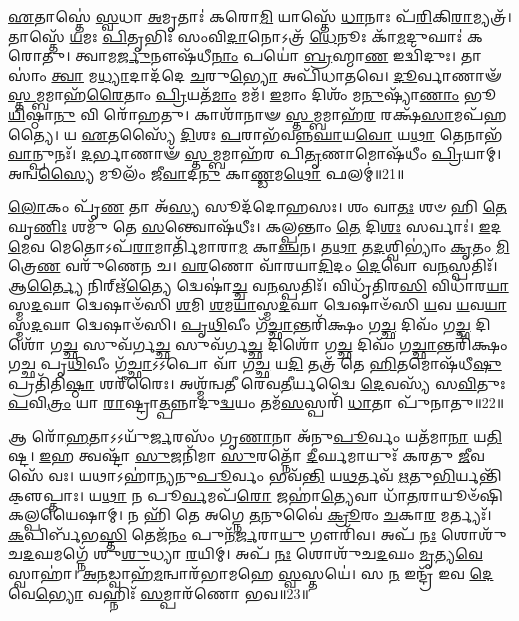 \-\ul{𑌏}\-𑌤𑌾𑌸𑍍𑌤𑍇॑ \ul{𑌸𑍍𑌵}\-𑌧𑌾 \ul{𑌅}\-𑌮𑍃𑌤𑌾𑌃॑ 𑌕𑌰𑍋\-\ul{𑌮𑌿} 𑌯𑌾𑌸𑍍𑌤𑍇᳴ \ul{𑌧𑌾}\-𑌨𑌾𑌃 𑌪᳴\-\ul{𑌰𑌿}\-𑌕𑌿\-\ul{𑌰𑌾}\-𑌮𑍍𑌯𑌤𑍍𑌰᳴। 
𑌤𑌾𑌸𑍍𑌤𑍇᳴ \ul{𑌯}\-𑌮𑌃 \ul{𑌪𑌿}\-𑌤𑍃𑌭𑌿𑌃᳴ 𑌸𑌂𑌵𑌿\-\ul{𑌦𑌾}\-𑌨𑍋𑌽𑌤𑍍𑌰᳴ \ul{𑌧𑍇}\-𑌨𑍂𑌃 𑌕𑌾᳴\-\ul{𑌮}\-𑌦𑍁𑌘𑌾𑌃॑ 𑌕𑌰𑍋𑌤𑍁। 
𑌤𑍍𑌵𑌾𑌮\-\ul{𑌰𑍍𑌜𑍁}\-𑌨𑍗𑌷᳴𑌧𑍀\-\ul{𑌨𑌾𑌂} 𑌪𑌯𑍋॑ \ul{𑌬𑍍𑌰}\-𑌹𑍍𑌮𑌾\-\ul{𑌣} 𑌇𑌦𑍍𑌵𑌿᳴𑌦𑍁𑌃। 
𑌤𑌾𑌸𑌾𑌂॑ \ul{𑌤𑍍𑌵𑌾} 𑌮\-\ul{𑌧𑍍𑌯𑌾}\-𑌦𑌾𑌦᳴𑌦𑍇 \ul{𑌚}\-𑌰𑍁\-\ul{𑌭𑍍𑌯𑍋} 𑌅𑌪𑌿᳴𑌧𑌾𑌤𑌵𑍇। 
\-\ul{𑌦𑍂}\-𑌰𑍍𑌵𑌾𑌣𑌾𑍟᳴ \ul{𑌸𑍍𑌤}\-𑌮𑍍𑌬𑌮𑌾𑌹᳴\-\ul{𑌰𑍈}\-𑌤𑌾𑌂 \ul{𑌪𑍍𑌰𑌿}\-𑌯𑌤᳴\-\ul{𑌮𑌾𑌂} 𑌮𑌮᳴। 
\-\ul{𑌇}\-𑌮𑌾𑌂 𑌦𑌿𑌶𑌂᳴ 𑌮\-\ul{𑌨𑍁}\-𑌷𑍍𑌯𑌾᳴\-\ul{𑌣𑌾𑌂} 𑌭𑍂\-\ul{𑌯𑌿}\-𑌷𑍍𑌠𑌾\-\ul{𑌨𑍁} 𑌵𑌿 𑌰𑍋᳴𑌹𑌤𑍁। 
𑌕𑌾𑌶𑌾᳴𑌨𑌾𑍟 \ul{𑌸𑍍𑌤}\-𑌮𑍍𑌬𑌮𑌾𑌹᳴\-\ul{𑌰} 𑌰𑌕𑍍𑌷᳴\-\ul{𑌸𑌾}\-𑌮𑌪᳴𑌹𑌤𑍍𑌯𑍈। 
𑌯 \ul{𑌏}\-𑌤𑌸𑍍𑌯𑍈᳴ \ul{𑌦𑌿}\-𑌶𑌃 \ul{𑌪}\-𑌰𑌾𑌭᳴𑌵𑌨𑍍𑌨\-\ul{𑌘𑌾}\-𑌯\-\ul{𑌵𑍋} 𑌯\-\ul{𑌥𑌾} 𑌤𑍇𑌨𑌾𑌭᳴\-\ul{𑌵𑌾}\-𑌨𑍍𑌪𑍁𑌨𑌃᳴। 
\-\ul{𑌦}\-𑌰𑍍𑌭𑌾𑌣𑌾𑍟᳴ \ul{𑌸𑍍𑌤}\-𑌮𑍍𑌬𑌮𑌾𑌹᳴𑌰 𑌪𑌿\-\ul{𑌤𑍃}\-𑌣𑌾𑌮𑍋𑌷᳴𑌧𑍀𑌂 \ul{𑌪𑍍𑌰𑌿}\-𑌯𑌾𑌮𑍍। 
𑌅𑌨𑍍𑌵\-\ul{𑌸𑍍𑌯𑍈} 𑌮𑍂𑌲𑌂᳴ 𑌜𑍀\-\ul{𑌵𑌾}\-𑌦\-\ul{𑌨𑍁} 𑌕𑌾\-\ul{𑌣𑍍𑌡}\-𑌮\-\ul{𑌥𑍋} 𑌫𑌲𑌮𑍍॑॥21॥

\-\ul{𑌲𑍋}\-𑌕𑌂 𑌪𑍃᳴\-\ul{𑌣} 𑌤𑌾 𑌅᳴\-\ul{𑌸𑍍𑌯} 𑌸𑍂𑌦᳴𑌦𑍋𑌹𑌸𑌃। 
𑌶𑌂 𑌵𑌾\-\ul{𑌤𑌃} 𑌶𑍞 𑌹𑌿 \ul{𑌤𑍇} 𑌘𑍃\-\ul{𑌣𑌿𑌃} 𑌶𑌮𑍁᳴ 𑌤𑍇 \ul{𑌸}\-𑌨𑍍𑌤𑍍𑌵𑍋𑌷᳴𑌧𑍀𑌃। 
𑌕𑌲𑍍𑌪𑌨𑍍𑌤𑌾𑌂 \ul{𑌤𑍇} 𑌦𑌿\-\ul{𑌶𑌃} 𑌸𑌰𑍍𑌵𑌾𑌃॑। 
\-\ul{𑌇}\-𑌦\-\ul{𑌮𑍇}\-𑌵 𑌮𑍇𑌤𑍋𑌽𑌪᳴\-\ul{𑌰𑌾}\-𑌮𑌾𑌰𑍍𑌤𑌿᳴𑌮𑌾𑌰𑌾\-\ul{𑌮} 𑌕𑌾\-\ul{𑌞𑍍𑌚}\-𑌨। 
𑌤\-\ul{𑌥𑌾} 𑌤\-\ul{𑌦}\-𑌶𑍍𑌵𑌿𑌭𑍍𑌯𑌾𑌂॑ \ul{𑌕𑍃}\-𑌤𑌂 \ul{𑌮𑌿}\-𑌤𑍍𑌰𑍇\-\ul{𑌣} 𑌵𑌰𑍁᳴𑌣𑍇𑌨 𑌚। 
\-\ul{𑌵}\-\-\ul{𑌰}\-𑌣𑍋 𑌵𑌾᳴𑌰𑌯𑌾\-\ul{𑌦𑌿}\-𑌦𑌂 \ul{𑌦𑍇}\-𑌵𑍋 𑌵\-\ul{𑌨}\-𑌸𑍍𑌪𑌤𑌿𑌃᳴। 
𑌆\-\ul{𑌰𑍍𑌤𑍍𑌯𑍈} 𑌨𑌿𑌰𑍍\mbox{}𑌋᳴\-\ul{𑌤𑍍𑌯𑍈} 𑌦𑍍𑌵𑍇𑌷𑌾॑\-\ul{𑌚𑍍𑌚} 𑌵\-\ul{𑌨}\-𑌸𑍍𑌪𑌤𑌿𑌃᳴। 
𑌵𑌿𑌧𑍃᳴𑌤𑌿𑌰\-\ul{𑌸𑌿} 𑌵𑌿𑌧𑌾᳴𑌰\-\ul{𑌯𑌾}\-𑌸𑍍𑌮\-\ul{𑌦}\-𑌘𑌾 𑌦𑍍𑌵𑍇𑌷𑌾𑍞᳴𑌸𑌿 \ul{𑌶}\-𑌮𑌿 \ul{𑌶}\-𑌮\-\ul{𑌯𑌾}\-𑌸𑍍𑌮\-\ul{𑌦}\-𑌘𑌾 𑌦𑍍𑌵𑍇𑌷𑌾𑍞᳴𑌸𑌿 \ul{𑌯}\-𑌵 \ul{𑌯}\-𑌵\-\ul{𑌯𑌾}\-𑌸𑍍𑌮\-\ul{𑌦}\-𑌘𑌾 𑌦𑍍𑌵𑍇𑌷𑌾𑍞᳴𑌸𑌿। 
\-\ul{𑌪𑍃}\-\-\ul{𑌥𑌿}\-𑌵𑍀𑌂 𑌗᳴\-\ul{𑌚𑍍𑌛𑌾}\-𑌨𑍍𑌤𑌰𑌿᳴𑌕𑍍𑌷𑌂 𑌗\-\ul{𑌚𑍍𑌛} 𑌦𑌿𑌵𑌂᳴ 𑌗\-\ul{𑌚𑍍𑌛} 𑌦𑌿𑌶𑍋᳴ 𑌗\-\ul{𑌚𑍍𑌛} 𑌸𑍁𑌵᳴𑌰𑍍𑌗\-\ul{𑌚𑍍𑌛} 𑌸𑍁𑌵᳴𑌰𑍍𑌗\-\ul{𑌚𑍍𑌛} 𑌦𑌿𑌶𑍋᳴ 𑌗\-\ul{𑌚𑍍𑌛} 𑌦𑌿𑌵𑌂᳴ 𑌗\-\ul{𑌚𑍍𑌛𑌾}\-𑌨𑍍𑌤𑌰𑌿᳴𑌕𑍍𑌷𑌂 𑌗𑌚𑍍𑌛 𑌪𑍃\-\ul{𑌥𑌿}\-𑌵𑍀𑌂 𑌗᳴\-\ul{𑌚𑍍𑌛𑌾}\-𑌽𑌽𑌪𑍋 𑌵𑌾᳴ 𑌗\-\ul{𑌚𑍍𑌛} 𑌯\-\ul{𑌦𑌿} 𑌤𑌤𑍍𑌰᳴ 𑌤𑍇 \ul{𑌹𑌿}\-𑌤𑌮𑍋𑌷᳴𑌧𑍀\-\ul{𑌷𑍁} 𑌪𑍍𑌰𑌤𑌿᳴𑌤𑌿\-\ul{𑌷𑍍𑌠𑌾} 𑌶𑌰𑍀᳴𑌰𑍈𑌃। 
𑌅𑌶𑍍𑌮᳴𑌨𑍍𑌵𑌤𑍀 𑌰𑍇𑌵\-\ul{𑌤𑍀}\-𑌰𑍍𑌯𑌦𑍍𑌵𑍈 \ul{𑌦𑍇}\-𑌵𑌸𑍍𑌯᳴ 𑌸\-\ul{𑌵𑌿}\-𑌤𑍁𑌃 \ul{𑌪}\-𑌵𑌿\-\ul{𑌤𑍍𑌰𑌂} 𑌯𑌾 \ul{𑌰𑌾}\-𑌷𑍍𑌟𑍍𑌰𑌾\-\ul{𑌤𑍍𑌪}\-𑌨𑍍𑌨𑌾𑌦𑍁\-\ul{𑌦𑍍𑌵}\-𑌯𑌂 𑌤𑌮᳴\-\ul{𑌸}\-𑌸𑍍𑌪𑌰𑌿᳴ \ul{𑌧𑌾}\-𑌤𑌾 𑌪𑍁᳴𑌨𑌾𑌤𑍁॥22॥
\anuvakamend[𑌫𑌲𑌂᳴ 𑌪𑍁𑌨𑌾𑌤𑍁]

𑌆 𑌰𑍋᳴\-\ul{𑌹}\-𑌤𑌾𑌽𑌽𑌯𑍁᳴\-\ul{𑌰𑍍𑌜}\-𑌰𑌸𑌂᳴ 𑌗𑍃\-\ul{𑌣𑌾}\-𑌨𑌾 𑌅᳴𑌨𑍁\-\ul{𑌪𑍂}\-𑌰𑍍𑌵𑌂 𑌯𑌤᳴𑌮𑌾\-\ul{𑌨𑌾} 𑌯\-\ul{𑌤𑌿}\-𑌷𑍍𑌟। 
\-\ul{𑌇}\-𑌹 𑌤𑍍𑌵𑌷𑍍𑌟𑌾᳴ \ul{𑌸𑍁}\-𑌜𑌨𑌿᳴𑌮𑌾 \ul{𑌸𑍁}\-𑌰𑌤𑍍𑌨𑍋᳴ \ul{𑌦𑍀}\-𑌰𑍍𑌘𑌮𑌾𑌯𑍁𑌃᳴ 𑌕𑌰𑌤𑍁 \ul{𑌜𑍀}\-𑌵𑌸𑍇᳴ 𑌵𑌃। 
𑌯𑌥𑌾𑌽𑌹𑌾॑𑌨𑍍𑌯𑌨𑍁\-\ul{𑌪𑍂}\-𑌰𑍍𑌵𑌂 𑌭𑌵᳴\-\ul{𑌨𑍍𑌤𑌿} 𑌯\-\ul{𑌥}\-𑌰𑍍𑌤𑌵᳴ \ul{𑌋}\-𑌤𑍁\-\ul{𑌭𑌿}\-𑌰𑍍𑌯𑌨𑍍𑌤𑌿᳴ 𑌕𑍢॒𑌪𑍍𑌤𑌾𑌃। 
𑌯\-\ul{𑌥𑌾} 𑌨 𑌪𑍂\-\ul{𑌰𑍍𑌵}\-𑌮𑌪᳴\-\ul{𑌰𑍋} 𑌜𑌹𑌾॑\-\ul{𑌤𑍍𑌯𑍇}\-𑌵𑌾 𑌧𑌾᳴\-\ul{𑌤}\-𑌰𑌾𑌯𑍂𑍞᳴𑌷𑌿 𑌕𑌲𑍍𑌪𑌯𑍈𑌷𑌾𑌮𑍍। 
𑌨 𑌹𑌿᳴ 𑌤𑍇 𑌅𑌗𑍍𑌨𑍇 \ul{𑌤}\-𑌨𑍁𑌵𑍈॑ \ul{𑌕𑍍𑌰𑍂}\-𑌰𑌂 \ul{𑌚}\-𑌕𑌾\-\ul{𑌰} 𑌮𑌰𑍍𑌤𑍍𑌯𑌃᳴। 
\-\ul{𑌕}\-𑌪𑌿𑌰𑍍𑌬᳴𑌭\-\ul{𑌸𑍍𑌤𑌿} 𑌤𑍇𑌜᳴\-\ul{𑌨𑌂} 𑌪𑍁𑌨᳴\-\ul{𑌰𑍍𑌜}\-𑌰𑌾\-\ul{𑌯𑍁} 𑌗𑍗𑌰𑌿᳴𑌵। 
𑌅𑌪᳴ \ul{𑌨𑌃} 𑌶𑍋𑌶𑍁᳴𑌚\-\ul{𑌦}\-𑌘𑌮𑌗𑍍𑌨𑍇᳴ 𑌶𑍁\-\ul{𑌶𑍁}\-𑌧𑍍𑌯𑌾 \ul{𑌰}\-𑌯𑌿𑌮𑍍। 
𑌅𑌪᳴ \ul{𑌨𑌃} 𑌶𑍋𑌶𑍁᳴𑌚\-\ul{𑌦}\-𑌘𑌂 \ul{𑌮𑍃}\-𑌤𑍍𑌯\-\ul{𑌵𑍇} 𑌸𑍍𑌵𑌾𑌹𑌾॑। 
\-\ul{𑌅}\-\-\ul{𑌨}\-𑌡𑍍𑌵𑌾𑌹᳴\-\ul{𑌮}\-𑌨𑍍𑌵𑌾𑌰᳴𑌭𑌾𑌮𑌹𑍇 \ul{𑌸𑍍𑌵}\-𑌸𑍍𑌤𑌯𑍇॑। 
𑌸 \ul{𑌨} 𑌇𑌨𑍍𑌦𑍍𑌰᳴ 𑌇𑌵 \ul{𑌦𑍇}\-𑌵𑍇\-\ul{𑌭𑍍𑌯𑍋} 𑌵𑌹𑍍𑌨𑌿𑌃᳴ \ul{𑌸}\-𑌮𑍍𑌪𑌾𑌰᳴𑌣𑍋 𑌭𑌵॥23॥

